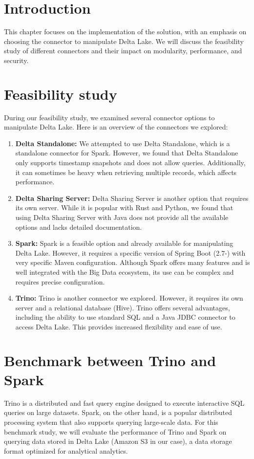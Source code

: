 
\section*{Introduction}

This chapter focuses on the implementation of the solution, with an emphasis on choosing the connector to manipulate Delta Lake. We will discuss the feasibility study of different connectors and their impact on modularity, performance, and security.

\section{Feasibility study}
During our feasibility study, we examined several connector options to manipulate Delta Lake. Here is an overview of the connectors we explored:

\begin{enumerate}
\item \textbf{Delta Standalone:} We attempted to use Delta Standalone, which is a standalone connector for Spark. However, we found that Delta Standalone only supports timestamp snapshots and does not allow queries. Additionally, it can sometimes be heavy when retrieving multiple records, which affects performance.
\item \textbf{Delta Sharing Server:} Delta Sharing Server is another option that requires its own server. While it is popular with Rust and Python, we found that using Delta Sharing Server with Java does not provide all the available options and lacks detailed documentation.
\item \textbf{Spark:} Spark is a feasible option and already available for manipulating Delta Lake. However, it requires a specific version of Spring Boot (2.7-) with very specific Maven configuration. Although Spark offers many features and is well integrated with the Big Data ecosystem, its use can be complex and requires precise configuration.
\item \textbf{Trino:} Trino is another connector we explored. However, it requires its own server and a relational database (Hive). Trino offers several advantages, including the ability to use standard SQL and a Java JDBC connector to access Delta Lake. This provides increased flexibility and ease of use.
\end{enumerate}

\section{Benchmark between Trino and Spark}
Trino is a distributed and fast query engine designed to execute interactive SQL queries on large datasets. Spark, on the other hand, is a popular distributed processing system that also supports querying large-scale data.
For this benchmark study, we will evaluate the performance of Trino and Spark on querying data stored in Delta Lake (Amazon S3 in our case), a data storage format optimized for analytical analytics.

